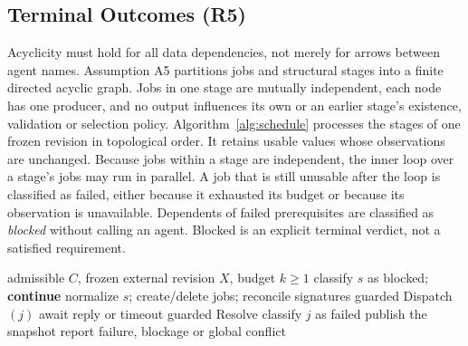 \documentclass[10pt,journal,compsoc]{IEEEtran}
\theoremstyle{plain}
\theoremstyle{definition}
\newcommand{\Pub}{\operatorname{Publishable}}
\newcommand{\nodata}{\bot}
\begin{document}
\subsection{Terminal Outcomes (R5)}
Acyclicity must hold for all data dependencies, not merely for arrows between agent names. Assumption A5 partitions jobs and structural stages into a finite directed acyclic graph. Jobs in one stage are mutually independent, each node has one producer, and no output influences its own or an earlier stage's existence, validation or selection policy. Algorithm~\ref{alg:schedule} processes the stages of one frozen revision in topological order. It retains usable values whose observations are unchanged. Because jobs within a stage are independent, the inner loop over a stage's jobs may run in parallel. A job that is still unusable after the loop is classified as failed, either because it exhausted its budget or because its observation is unavailable. Dependents of failed prerequisites are classified as \emph{blocked} without calling an agent. Blocked is an explicit terminal verdict, not a satisfied requirement.

\begin{algorithm}[!t]
\caption{Topological repair of a stable revision}\label{alg:schedule}
\footnotesize
\begin{algorithmic}[1]
\Require admissible $C$, frozen external revision $X$, budget $k\ge1$
    \State classify $s$ as blocked; \textbf{continue}
  \EndIf
  \State normalize $s$; create/delete jobs; reconcile signatures
    \While{$\neg U_j\land n_j<k\land o_j\ne\nodata$}
      \State guarded Dispatch$(j)$
      \State await reply or timeout
      \State guarded Resolve
    \EndWhile
     classify $j$ as failed \EndIf
  \EndFor
\EndFor
\If{$\Pub(S)$}
  \State publish the snapshot
\Else
  \State report failure, blockage or global conflict
\EndIf
\end{algorithmic}
\end{algorithm}
\end{document}

